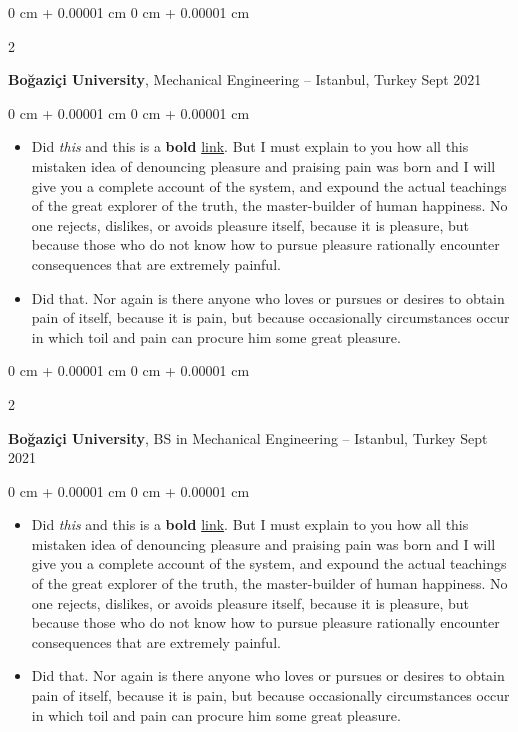 \documentclass[10pt, letterpaper]{article}
\newenvironment{highlights}{
    \begin{itemize}[
        topsep=0.10 cm,
        parsep=0.10 cm,
        partopsep=0pt,
        itemsep=0pt,
        leftmargin=0 cm + 10pt
    ]
}{
    \end{itemize}
} %
\newenvironment{onecolentry}{
    \begin{adjustwidth}{
        0 cm + 0.00001 cm
    }{
        0 cm + 0.00001 cm
    }
}{
    \end{adjustwidth}
} %
\newenvironment{twocolentry}[2][]{
    \onecolentry
    \def\secondColumn{#2}
    \setcolumnwidth{\fill, 4.5 cm}
    \begin{paracol}{2}
}{
    \switchcolumn \raggedleft \secondColumn
    \end{paracol}
    \endonecolentry
} %
\begin{document}
        \vspace{0.2 cm}

        \begin{twocolentry}{
            Sept 2021
        }
            \textbf{Boğaziçi University}, Mechanical Engineering -- Istanbul, Turkey\end{twocolentry}

        \vspace{0.10 cm}
        \begin{onecolentry}
            \begin{highlights}
                \item Did \textit{this} and this is a \textbf{bold} \href{https://example.com}{link}. But I must explain to you how all this mistaken idea of denouncing pleasure and praising pain was born and I will give you a complete account of the system, and expound the actual teachings of the great explorer of the truth, the master-builder of human happiness. No one rejects, dislikes, or avoids pleasure itself, because it is pleasure, but because those who do not know how to pursue pleasure rationally encounter consequences that are extremely painful.
                \item Did that. Nor again is there anyone who loves or pursues or desires to obtain pain of itself, because it is pain, but because occasionally circumstances occur in which toil and pain can procure him some great pleasure.
            \end{highlights}
        \end{onecolentry}


        \vspace{0.2 cm}

        \begin{twocolentry}{
            Sept 2021
        }
            \textbf{Boğaziçi University}, BS in Mechanical Engineering -- Istanbul, Turkey\end{twocolentry}

        \vspace{0.10 cm}
        \begin{onecolentry}
            \begin{highlights}
                \item Did \textit{this} and this is a \textbf{bold} \href{https://example.com}{link}. But I must explain to you how all this mistaken idea of denouncing pleasure and praising pain was born and I will give you a complete account of the system, and expound the actual teachings of the great explorer of the truth, the master-builder of human happiness. No one rejects, dislikes, or avoids pleasure itself, because it is pleasure, but because those who do not know how to pursue pleasure rationally encounter consequences that are extremely painful.
                \item Did that. Nor again is there anyone who loves or pursues or desires to obtain pain of itself, because it is pain, but because occasionally circumstances occur in which toil and pain can procure him some great pleasure.
            \end{highlights}
        \end{onecolentry}
\end{document}

